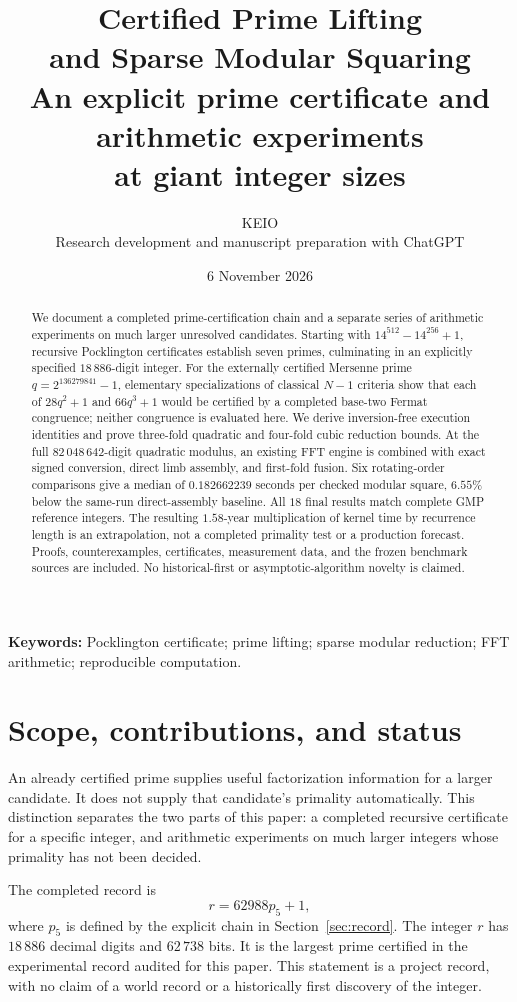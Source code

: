 \documentclass[11pt,a4paper]{article}
\title{\color{ink}\bfseries Certified Prime Lifting\\and Sparse Modular Squaring\\[7pt]
 \large\normalfont An explicit prime certificate and arithmetic experiments\\at giant integer sizes}
\author{KEIO\\[3pt]\small Research development and manuscript preparation with ChatGPT}
\date{6 November 2026}
\theoremstyle{definition}
\begin{document}
\maketitle
\begin{abstract}
We document a completed prime-certification chain and a separate series of
arithmetic experiments on much larger unresolved candidates. Starting with
$14^{512}-14^{256}+1$, recursive Pocklington certificates establish seven
primes, culminating in an explicitly specified $18\,886$-digit integer.
For the externally certified Mersenne prime $q=2^{136279841}-1$, elementary
specializations of classical $N-1$ criteria show that each of $28q^2+1$ and
$66q^3+1$ would be certified by a completed base-two Fermat congruence;
neither congruence is evaluated here. We derive inversion-free execution
identities and prove three-fold quadratic and four-fold cubic reduction
bounds. At the full $82\,048\,642$-digit quadratic modulus, an existing FFT
engine is combined with exact signed conversion, direct limb assembly, and
first-fold fusion. Six rotating-order comparisons give a median of
$0.182662239$ seconds per checked modular square, $6.55\%$ below the
same-run direct-assembly baseline. All $18$ final results match complete
GMP reference integers. The resulting $1.58$-year multiplication of kernel
time by recurrence length is an extrapolation, not a completed primality
test or a production forecast. Proofs, counterexamples, certificates,
measurement data, and the frozen benchmark sources are included. No
historical-first or asymptotic-algorithm novelty is claimed.
\end{abstract}
\noindent\textbf{Keywords:} Pocklington certificate; prime lifting; sparse modular
reduction; FFT arithmetic; reproducible computation.
\clearpage
\tableofcontents
\clearpage
\section{Scope, contributions, and status}
\label{sec:scope}

An already certified prime supplies useful factorization information for a
larger candidate. It does not supply that candidate's primality automatically.
This distinction separates the two parts of this paper: a completed recursive
certificate for a specific integer, and arithmetic experiments on much larger
integers whose primality has not been decided.

The completed record is
\[
 r=62988p_5+1,
\]
where $p_5$ is defined by the explicit chain in Section~\ref{sec:record}.
The integer $r$ has $18\,886$ decimal digits and $62\,738$ bits. It is the
largest prime certified in the experimental record audited for this paper.
This statement is a project record, with no claim of a world record or a
historically first discovery of the integer.
\end{document}
